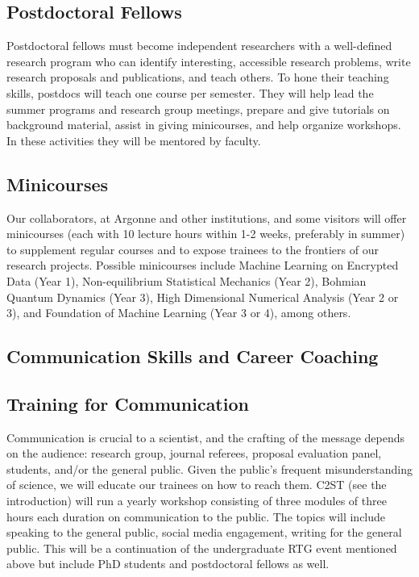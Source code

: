\documentclass[11pt]{NSFamsart}
\begin{document}
\subsection*{Postdoctoral Fellows}
Postdoctoral fellows must become independent researchers with a well-defined research program who can identify interesting, accessible research problems, write research proposals and publications, and teach others.  To hone their teaching skills, postdocs will teach one course per semester. They will help lead the summer programs and research group meetings, prepare and give tutorials on background material, assist in giving minicourses, and help organize workshops.  In these activities they will be mentored by faculty.

\subsection*{Minicourses}
Our collaborators, at Argonne and other institutions, and some visitors will offer minicourses (each with 10 lecture hours within 1-2 weeks, preferably in summer) to supplement regular courses and to expose trainees to the frontiers of our research projects. Possible minicourses include  Machine Learning on Encrypted Data (Year 1),  Non-equilibrium Statistical Mechanics (Year 2),   Bohmian Quantum Dynamics (Year 3), High Dimensional Numerical Analysis (Year 2 or 3), and Foundation of Machine Learning (Year 3 or 4), among others. 

\subsection{Communication Skills and Career Coaching}
\subsection*{Training for Communication}
Communication is crucial to a scientist, and the crafting of the message depends on the audience:  research group, journal referees, proposal evaluation panel, students, and/or the general public.  Given the public's frequent misunderstanding of science, we will educate our trainees on how to reach them.  C2ST (see the introduction) will run a yearly workshop consisting of three modules of three hours each duration on communication to the public.  The topics will include speaking to the general public, social media engagement, writing for the general public.  This will be a continuation of the undergraduate RTG event mentioned above but include PhD students and postdoctoral fellows as well.
\end{document}
